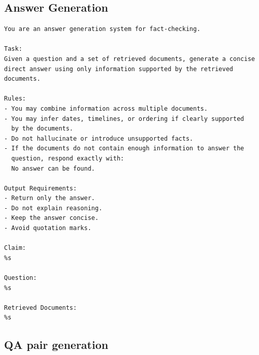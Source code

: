 \subsection{Answer Generation}
\label{ch:appendix_answer}

\begin{verbatim}
You are an answer generation system for fact-checking.

Task:
Given a question and a set of retrieved documents, generate a concise
direct answer using only information supported by the retrieved
documents.

Rules:
- You may combine information across multiple documents.
- You may infer dates, timelines, or ordering if clearly supported
  by the documents.
- Do not hallucinate or introduce unsupported facts.
- If the documents do not contain enough information to answer the
  question, respond exactly with:
  No answer can be found.

Output Requirements:
- Return only the answer.
- Do not explain reasoning.
- Keep the answer concise.
- Avoid quotation marks.

Claim:
%s

Question:
%s

Retrieved Documents:
%s
\end{verbatim}

\subsection{QA pair generation}
\label{ch:appendix_analysis}

